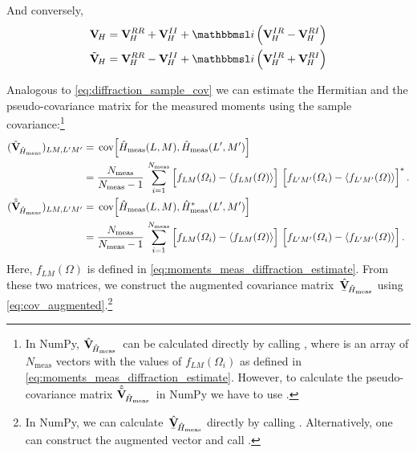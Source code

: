 And conversely,
\begin{align}
  \covMatSym_{\!H}
  = \covMatSym_{\!H}^{RR} + \covMatSym_{\!H}^{II} + \imag \rBrk{\covMatSym_{\!H}^{IR} - \covMatSym_{\!H}^{RI}}
  \\
  \tilde{\covMatSym}_{\!H}
  = \covMatSym_{\!H}^{RR} - \covMatSym_{\!H}^{II} + \imag \rBrk{\covMatSym_{\!H}^{IR} + \covMatSym_{\!H}^{RI}}
\end{align}

Analogous to \cref{eq:diffraction_sample_cov} we can estimate the
Hermitian and the pseudo-covariance matrix for the measured moments
using the sample covariance:\footnote{In NumPy,
$\hat{\mathbf{V}}_{\!\hat{H}_\text{meas}}$~can be calculated directly
by calling , where  is an array of
$N_\text{meas}$ vectors with the values of $f_{L M}(\Omega_i)$ as
defined in \cref{eq:moments_meas_diffraction_estimate}.  However, to
calculate the pseudo-covariance matrix
$\hat{\tilde{\mathbf{V}}}_{\!\hat{H}_\text{meas}}$~in NumPy we have to
use .}
\begin{align}
  (\hat{\covMatSym}_{\!\hat{H}_\text{meas}})_{L M, L' M'}
  ={}& \cov[2]{\hat{H}_\text{meas}(L, M), \hat{H}_\text{meas}(L', M')} \notag
  \\
  \label{eq:diffraction_sample_cov_hermit_meas}
  ={}& \frac{N_\text{meas}}{N_\text{meas} - 1}\, \sum_{i = 1}^{N_\text{meas}}
  \sBrk[2]{f_{L M}(\Omega_i) - \mean{f_{L M}(\Omega)}}\, \sBrk[2]{f_{L' M'}(\Omega_i) - \mean{f_{L' M'}(\Omega)}}^*.
  \\
  (\hat{\tilde{\covMatSym}}_{\!\hat{H}_\text{meas}})_{L M, L' M'}
  ={}& \cov[2]{\hat{H}_\text{meas}(L, M), \hat{H}_\text{meas}^*(L', M')} \notag
  \\
  \label{eq:diffraction_sample_cov_pseudo_meas}
  ={}& \frac{N_\text{meas}}{N_\text{meas} - 1}\, \sum_{i = 1}^{N_\text{meas}}
  \sBrk[2]{f_{L M}(\Omega_i) - \mean{f_{L M}(\Omega)}}\, \sBrk[2]{f_{L' M'}(\Omega_i) - \mean{f_{L' M'}(\Omega)}}.
\end{align}
Here, $f_{L M}(\Omega)$ is defined in
\cref{eq:moments_meas_diffraction_estimate}.  From these two matrices,
we construct the augmented covariance
matrix~$\hat{\underaccent{\bar}{\covMatSym}}_{\!\hat{H}_\text{meas}}$
using \cref{eq:cov_augmented}.\footnote{In NumPy, we can
calculate~$\hat{\underaccent{\bar}{\covMatSym}}_{\!\hat{H}_\text{meas}}$
directly by calling .
Alternatively, one can construct the augmented vector  and call
.}

